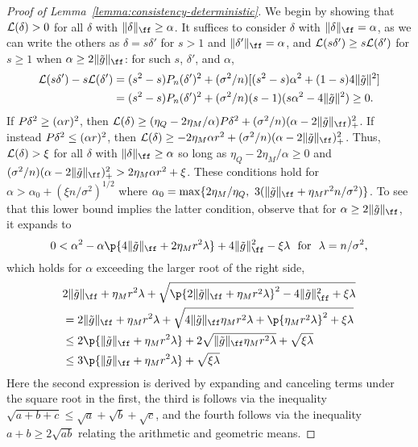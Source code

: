 \begin{proof}[Proof of Lemma~\ref{lemma:consistency-deterministic}]
We begin by showing that $\mathcal{L}(\delta) > 0$ for all $\delta$ with $\norm{\delta}_{\ff} \ge \alpha$.
It suffices to consider $\delta$ with $\norm{\delta}_{\ff} = \alpha$,
as we can write the others as $\delta=s\delta'$ for $s > 1$ and $\norm{\delta'}_{\ff} = \alpha$,
and $\mathcal{L}(s\delta') \ge s \mathcal{L}(\delta')$ for $s \ge 1$ when $\alpha \ge 2\norm{\gapprox}_{\ff}$: 
for such $s$, $\delta'$, and $\alpha$,
\begin{align*}
\excess(s\delta') - s \excess(\delta') &= (s^2-s)\Pn (\delta')^2 + (\sigma^2/n)[(s^2-s)\alpha^2 + (1-s)4\norm{\gapprox}^2] \\  
				       &= (s^2-s)\Pn (\delta')^2 + (\sigma^2/n)(s-1)(s\alpha^2 - 4\norm{\gapprox}^2) \ge 0.
\end{align*}
If $\P \delta^2 \ge (\alpha r)^2$, then 
$\excess(\delta) \ge (\eta_Q - 2\eta_M/\alpha) \P \delta^2 + (\sigma^2/n)(\alpha - 2\norm{\gapprox}_{\ff})_+^2$.
If instead $\P \delta^2 \le (\alpha r)^2$, then 
$\excess(\delta) \ge -2\eta_M \alpha r^2 + (\sigma^2/n)(\alpha - 2\norm{\gapprox}_{\ff})_+^2$.
Thus, $\mathcal{L}(\delta) > \xi$ for all $\delta$ with $\norm{\delta}_{\ff} \ge \alpha$ 
so long as $\eta_Q - 2\eta_M/\alpha \ge 0$ and $(\sigma^2/n)(\alpha - 2\norm{\gapprox}_{\ff})_+^2 > 2\eta_M \alpha r^2 + \xi$.
These conditions hold for $\alpha > \alpha_0 + (\xi n/\sigma^2)^{1/2}$  where
$\alpha_0 = \max\set{2\eta_M/\eta_Q,\ 3(\norm{\gapprox}_{\ff} + \eta_M r^2 n/\sigma^2)}$.
To see that this lower bound implies the latter condition,
observe that for $\alpha \ge 2\norm{\gapprox}_{\ff}$, it expands to
\[ 0 < \alpha^2 - \alpha \p{4\norm{\gapprox}_{\ff} + 2\eta_M r^2 \lambda} + 4\norm{\gapprox}_{\ff}^2 - \xi \lambda \ \text{ for }\ \lambda = n/\sigma^2,\] 
which holds for $\alpha$ exceeding the larger root of the right side,
\begin{align*} 
&2\norm{\gapprox}_{\ff} + \eta_M  r^2 \lambda 
+ \sqrt{ \p{2\norm{\gapprox}_{\ff} + \eta_M  r^2 \lambda}^2 -  4\norm{\gapprox}_{\ff}^2 + \xi \lambda } \\
&= 2\norm{\gapprox}_{\ff} + \eta_M  r^2 \lambda 
+ \sqrt{ 4\norm{\gapprox}_{\ff}\eta_M  r^2 \lambda + \p{\eta_M  r^2 \lambda}^2 + \xi \lambda } \\
&\le 2\p{\norm{\gapprox}_{\ff} + \eta_M  r^2 \lambda}
+ 2 \sqrt{\norm{\gapprox}_{\ff}\eta_M  r^2 \lambda } + \sqrt{\xi \lambda } \\
& \le 3\p{\norm{\gapprox}_{\ff} + \eta_M r^2 \lambda} + \sqrt{\xi\lambda}
\end{align*}
Here the second expression is derived by
expanding and canceling terms under the square root in the first,
the third is follows via the inequality $\sqrt{a+b+c} \le \sqrt{a}+\sqrt{b} + \sqrt{c}$,
and the fourth follows via the inequality $a+b \ge 2\sqrt{ab}$ relating the arithmetic and geometric means.





\end{proof}
